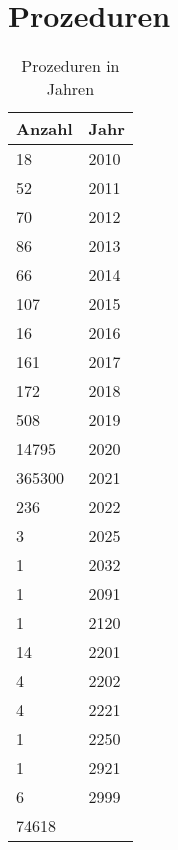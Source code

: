 \section{Prozeduren}
\begin{center}
 \begin{longtable}{|p{2.3cm}|p{2.5cm}|}
  \caption{Prozeduren in Jahren} \\
  \hline
\rowcolor{lightgray} Anzahl & Jahr \\ \hline
\endhead
18 & 2010 \\ \hline
52 & 2011 \\ \hline
70 & 2012 \\ \hline
86 & 2013 \\ \hline
66 & 2014 \\ \hline
107 & 2015 \\ \hline
16 & 2016 \\ \hline
161 & 2017 \\ \hline
172 & 2018 \\ \hline
508 & 2019 \\ \hline
14795 & 2020 \\ \hline
365300 & 2021 \\ \hline
236 & 2022 \\ \hline
3 & 2025 \\ \hline
1 & 2032 \\ \hline
1 & 2091 \\ \hline
1 & 2120 \\ \hline
14 & 2201 \\ \hline
4 & 2202 \\ \hline
4 & 2221 \\ \hline
1 & 2250 \\ \hline
1 & 2921 \\ \hline
6 & 2999 \\ \hline
74618 &  \\ \hline
\end{longtable}
\end{center}
